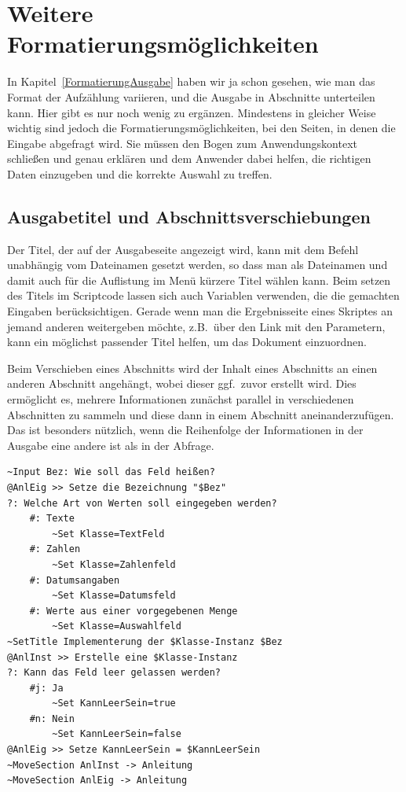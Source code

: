 \chapter{Weitere Formatierungsmöglichkeiten}
In Kapitel~\ref{FormatierungAusgabe} haben wir ja schon gesehen, wie man das Format der Aufzählung variieren, und die Ausgabe in Abschnitte unterteilen kann. Hier gibt es nur noch wenig zu ergänzen. Mindestens in gleicher Weise wichtig sind jedoch die Formatierungsmöglichkeiten, bei den Seiten, in denen die Eingabe abgefragt wird. Sie müssen den Bogen zum Anwendungskontext schließen und genau erklären und dem Anwender dabei helfen, die richtigen Daten einzugeben und die korrekte Auswahl zu treffen.

\section{Ausgabetitel und Abschnittsverschiebungen}\label{AusgabetitelUndAbschnittsverschiebungen}
Der Titel, der auf der Ausgabeseite angezeigt wird, kann mit dem Befehl  unabhängig vom Dateinamen gesetzt werden, so dass man als Dateinamen und damit auch für die Auf\-lis\-tung im Menü kürzere Titel wählen kann. Beim setzen des Titels im Scriptcode lassen sich auch Variablen verwenden, die die gemachten Eingaben berücksichtigen. Gerade wenn man die Ergebnisseite eines Skriptes an jemand anderen weitergeben möchte, z.B.\ über den Link mit den Parametern, kann ein möglichst passender Titel helfen, um das Dokument einzuordnen.

Beim Verschieben eines Abschnitts wird der Inhalt eines Abschnitts an einen anderen Abschnitt angehängt, wobei dieser ggf.\ zuvor erstellt wird. Dies ermöglicht es, mehrere Informationen zunächst parallel in verschiedenen Abschnitten zu sammeln und diese dann in einem Abschnitt aneinanderzufügen. Das ist besonders nützlich, wenn die Reihenfolge der Informationen in der Ausgabe eine andere ist als in der Abfrage.

\label{BspAbschnittsverschiebung}
\begin{verbatim}
~Input Bez: Wie soll das Feld heißen?
@AnlEig >> Setze die Bezeichnung "$Bez"
?: Welche Art von Werten soll eingegeben werden?
    #: Texte
        ~Set Klasse=TextFeld        
    #: Zahlen
        ~Set Klasse=Zahlenfeld
    #: Datumsangaben
        ~Set Klasse=Datumsfeld
    #: Werte aus einer vorgegebenen Menge
        ~Set Klasse=Auswahlfeld
~SetTitle Implementerung der $Klasse-Instanz $Bez
@AnlInst >> Erstelle eine $Klasse-Instanz
?: Kann das Feld leer gelassen werden?
    #j: Ja
        ~Set KannLeerSein=true
    #n: Nein
        ~Set KannLeerSein=false
@AnlEig >> Setze KannLeerSein = $KannLeerSein
~MoveSection AnlInst -> Anleitung
~MoveSection AnlEig -> Anleitung
\end{verbatim}

